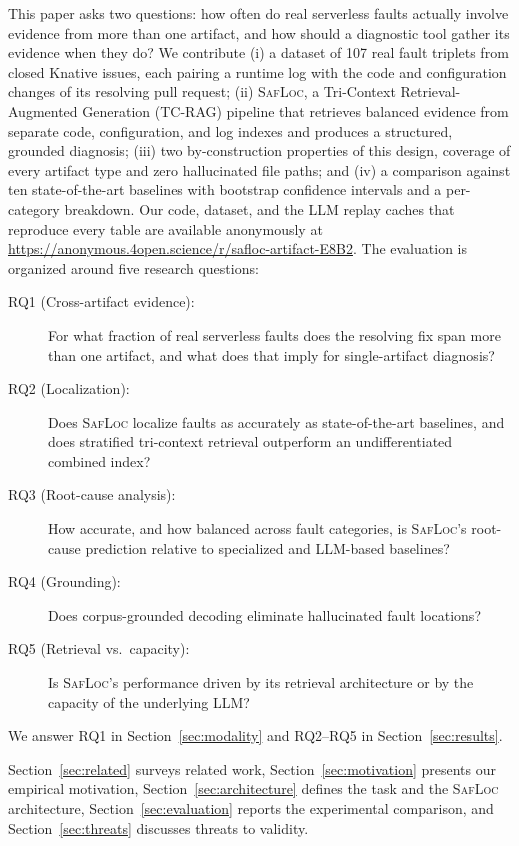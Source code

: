 \documentclass[runningheads]{llncs}
\begin{document}
This paper asks two questions: how often do real serverless faults actually involve evidence from more than one artifact, and how should a diagnostic tool gather its evidence when they do? We contribute (i) a dataset of 107 real fault triplets from closed Knative issues, each pairing a runtime log with the code and configuration changes of its resolving pull request; (ii) \textsc{SafLoc}, a Tri-Context Retrieval-Augmented Generation (TC-RAG) pipeline that retrieves balanced evidence from separate code, configuration, and log indexes and produces a structured, grounded diagnosis; (iii) two by-construction properties of this design, coverage of every artifact type and zero hallucinated file paths; and (iv) a comparison against ten state-of-the-art baselines with bootstrap confidence intervals and a per-category breakdown. Our code, dataset, and the LLM replay caches that reproduce every table are available anonymously at \url{https://anonymous.4open.science/r/safloc-artifact-E8B2}. The evaluation is organized around five research questions:
\begin{description}
\item[RQ1 (Cross-artifact evidence):] For what fraction of real serverless faults does the resolving fix span more than one artifact, and what does that imply for single-artifact diagnosis?
\item[RQ2 (Localization):] Does \textsc{SafLoc} localize faults as accurately as state-of-the-art baselines, and does stratified tri-context retrieval outperform an undifferentiated combined index?
\item[RQ3 (Root-cause analysis):] How accurate, and how balanced across fault categories, is \textsc{SafLoc}'s root-cause prediction relative to specialized and LLM-based baselines?
\item[RQ4 (Grounding):] Does corpus-grounded decoding eliminate hallucinated fault locations?
\item[RQ5 (Retrieval vs.\ capacity):] Is \textsc{SafLoc}'s performance driven by its retrieval architecture or by the capacity of the underlying LLM?
\end{description}
We answer RQ1 in Section~\ref{sec:modality} and RQ2--RQ5 in Section~\ref{sec:results}.

Section~\ref{sec:related} surveys related work, Section~\ref{sec:motivation} presents our empirical motivation, Section~\ref{sec:architecture} defines the task and the \textsc{SafLoc} architecture, Section~\ref{sec:evaluation} reports the experimental comparison, and Section~\ref{sec:threats} discusses threats to validity.
\end{document}
